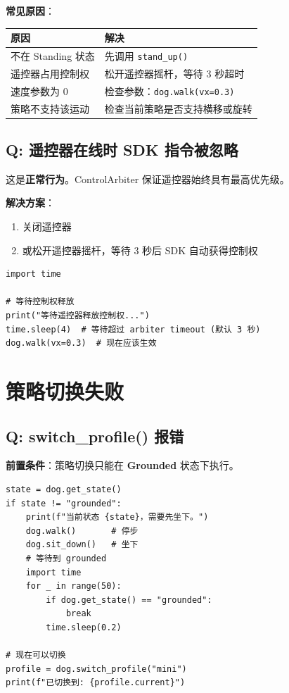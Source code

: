 \documentclass[a4paper,11pt,openany]{book}
\begin{document}
\noindent\textbf{常见原因}：

\begin{longtable}{ll}
\toprule
原因 & 解决 \\
\midrule
\endhead
不在 Standing 状态 & 先调用 \texttt{stand\_up()} \\
遥控器占用控制权 & 松开遥控器摇杆，等待 3 秒超时 \\
速度参数为 0 & 检查参数：\texttt{dog.walk(vx=0.3)} \\
策略不支持该运动 & 检查当前策略是否支持横移或旋转 \\
\bottomrule
\end{longtable}

\subsection{Q: 遥控器在线时 SDK 指令被忽略}

这是\textbf{正常行为}。ControlArbiter 保证遥控器始终具有最高优先级。

\noindent\textbf{解决方案}：
\begin{enumerate}[nosep]
  \item 关闭遥控器
  \item 或松开遥控器摇杆，等待 3 秒后 SDK 自动获得控制权
\end{enumerate}

\begin{lstlisting}[style=python]
import time

# 等待控制权释放
print("等待遥控器释放控制权...")
time.sleep(4)  # 等待超过 arbiter timeout (默认 3 秒)
dog.walk(vx=0.3)  # 现在应该生效
\end{lstlisting}

\section{策略切换失败}

\subsection{Q: switch\_profile() 报错}

\noindent\textbf{前置条件}：策略切换只能在 \textbf{Grounded} 状态下执行。

\begin{lstlisting}[style=python]
state = dog.get_state()
if state != "grounded":
    print(f"当前状态 {state}，需要先坐下。")
    dog.walk()       # 停步
    dog.sit_down()   # 坐下
    # 等待到 grounded
    import time
    for _ in range(50):
        if dog.get_state() == "grounded":
            break
        time.sleep(0.2)

# 现在可以切换
profile = dog.switch_profile("mini")
print(f"已切换到: {profile.current}")
\end{lstlisting}
\end{document}
